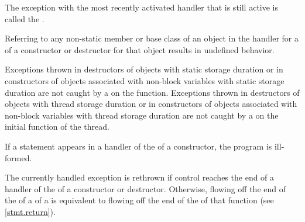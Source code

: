 \pnum
{}%
The exception with the most recently activated handler that is
still active is called the
.

\pnum
Referring to any non-static member or base class of an object
in the handler for a
of a constructor or destructor for that object results in undefined behavior.
%
%
%
%
%

\pnum
Exceptions thrown in destructors of objects with static storage duration or in
constructors of objects associated with non-block variables with static storage duration are not caught by a
on
the  function.
Exceptions thrown in destructors of objects with thread storage duration or in constructors of objects associated with non-block variables with thread storage duration are not caught by a
on the initial function of the thread.

\pnum
If a  statement appears in a handler of the
of a
constructor, the program is ill-formed.

\pnum
The currently handled exception
is rethrown if control reaches the end of a handler of the
of a constructor or destructor.
Otherwise, flowing off the end of
the 
of a 
of a 
is equivalent to flowing off the end of
the 
of that function (see \ref{stmt.return}).

